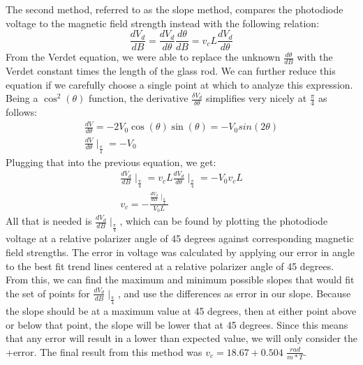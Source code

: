 \documentclass[prb,preprint]{revtex4-1}
\begin{document}
The second method, referred to as the slope method, compares the photodiode voltage to the magnetic field strength instead with the following relation:
\begin{equation}
\frac{dV_d}{dB}= \frac{dV_d}{d\theta }\frac{d\theta }{dB}=v_cL\frac{dV_d}{d\theta }
\end{equation}
From the Verdet equation, we were able to replace the unknown $\frac{d\theta }{dB}$ with the Verdet constant times the length of the glass rod. We can further reduce this equation if we carefully choose a single point at which to analyze this expression. Being a $\cos^2(\theta)$ function, the derivative $\frac{\delta V_d}{\delta \theta}$ simplifies very nicely at $\frac{\pi}{4}$ as follows:
\begin{eqnarray}
\label{derivative}
\frac{dV}{d\theta }=-2V_0\cos(\theta )\sin(\theta )=-V_0sin(2\theta )\\
\frac{dV}{d\theta } \mid_{\frac{\pi }{4}}=-V_0
\end{eqnarray}
Plugging that into the previous equation, we get:
\begin{eqnarray}
\label{slope eqn}
\frac{dV_d}{dB}\mid_\frac{\pi }{4}=v_cL\frac{dV_d}{d\theta }\mid_\frac{\pi }{4}=-V_0v_cL\\
v_c=-\frac{\frac{dV_d}{dB}\mid_\frac{\pi }{4}}{V_0L}
\end{eqnarray}
All that is needed is $\frac{dV_d}{dB}\mid_\frac{\pi }{4}$, which can be found by plotting the photodiode voltage at a relative polarizer angle of 45 degrees against corresponding magnetic field strengths. The error in voltage was calculated by applying our error in angle to the best fit trend lines centered at a relative polarizer angle of 45 degrees. From this, we can find the maximum and minimum possible slopes that would fit the set of points for $\frac{dV_d}{dB}\mid_\frac{\pi }{4}$, and use the differences as error in our slope. Because the slope should be at a maximum value at 45 degrees, then at either point above or below that point, the slope will be lower that at 45 degrees. Since this means that any error will result in a lower than expected value, we will only consider the +error. The final result from this method was $v_c = 18.67 + 0.504$ $\frac{rad}{m*T}$.
\end{document}
